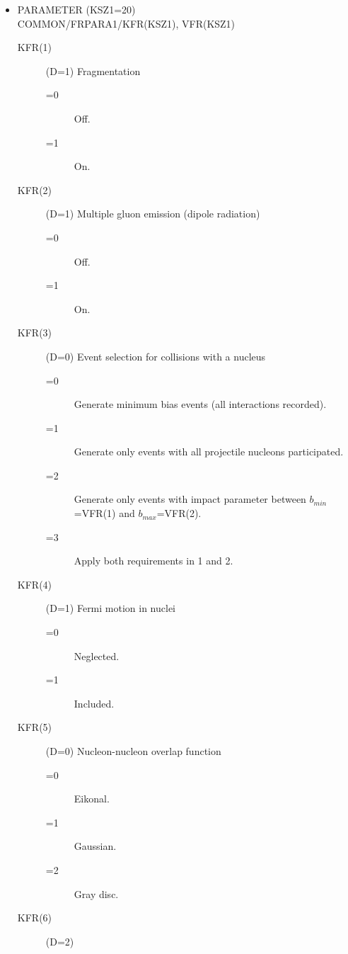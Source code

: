 \begin{itemize}
\item{PARAMETER (KSZ1=20) \\
      COMMON/FRPARA1/KFR(KSZ1), VFR(KSZ1)}

\begin{description}
\item[KFR(1)] (D=1)
       Fragmentation
      \begin{description}
       \item[=0] Off.
       \item[=1] On.   
      \end{description}
\item[KFR(2)] (D=1) 
       Multiple gluon emission (dipole radiation) 
      \begin{description}
       \item[=0] Off.
       \item[=1] On.
      \end{description}
\item[KFR(3)] (D=0) Event selection for collisions with a nucleus 
      \begin{description}
       \item[=0] Generate minimum bias events (all interactions recorded).
       \item[=1] Generate only events with all projectile nucleons
                  participated.
       \item[=2] Generate only events with impact parameter between
                  $b_{min}$=VFR(1) and $b_{max}$=VFR(2).
       \item[=3] Apply both requirements in 1 and 2.
      \end{description}
\item[KFR(4)] (D=1)
       Fermi motion in nuclei 
      \begin{description}
       \item[=0] Neglected.
       \item[=1] Included.
      \end{description}
\item[KFR(5)] (D=0) 
       Nucleon-nucleon overlap function 
      \begin{description}
       \item[=0] Eikonal.
       \item[=1] Gaussian.
       \item[=2] Gray disc.
      \end{description}
\item[KFR(6)] (D=2)

\end{description}
\end{itemize}
